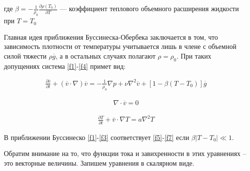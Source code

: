 \documentclass[a4paper, 12pt]{article}
\begin{document}
    где $\beta = - \frac{1}{\rho_0} \frac{\partial \rho(T_0)}{\partial T}$ --- коэффициент теплового объемного расширения жидкости при $T=T_0$

    Главная идея приближения Буссинеска-Обербека заключается в том, что зависимость плотности от температуры учитывается лишь в члене с объемной силой тяжести $\rho \overline g$, а в остальных случаях полагают $\rho = \rho_0$. При таких допущениях система \eqref{f1}-\eqref{f4} примет вид:

    \begin{equation}
    \begin{gathered}
    \label{f5}
    \frac{\partial \overline v}{\partial t} + (\overline v \cdot \nabla)\overline v = -\frac{1}{\rho_0}\nabla p + \nu \nabla^2 \overline v + [1-\beta(T-T_0)]\overline g
    \end{gathered}
    \end{equation}

    \begin{equation}
    \begin{gathered}
    \label{f6}
    \nabla \cdot \overline v = 0
    \end{gathered}
    \end{equation}

    \begin{equation}
    \begin{gathered}
    \label{f7}
    \frac{\partial T}{\partial t} + \overline v \cdot \nabla T = a \nabla^2 T
    \end{gathered}
    \end{equation}

    В приближении Буссинеско \eqref{f1}-\eqref{f3} соответствует \eqref{f5}-\eqref{f7} если ${\beta |T-T_0| \ll 1}$.

    Обратим внимание на то, что функции тока и завихренности в этих уравнениях – это векторные величины. Запишем уравнения в скалярном виде.
\end{document}
